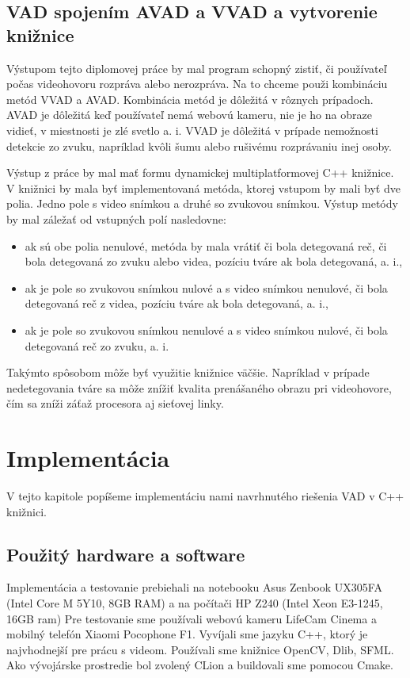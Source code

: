 \section{VAD spojením AVAD a VVAD a vytvorenie knižnice}
Výstupom tejto diplomovej práce by mal program schopný zistiť, či používateľ počas videohovoru rozpráva alebo nerozpráva. 
Na to chceme použi kombináciu metód VVAD a AVAD. 
Kombinácia metód je dôležitá v rôznych prípadoch. 
AVAD je dôležitá keď používateľ nemá webovú kameru, nie je ho na obraze vidieť, v miestnosti je zlé svetlo a. i.
VVAD je dôležitá v prípade nemožnosti detekcie zo zvuku, napríklad kvôli šumu alebo rušivému rozprávaniu inej osoby.

Výstup z práce by mal mať formu dynamickej multiplatformovej C++ knižnice. 
V knižnici by mala byť implementovaná metóda, ktorej vstupom by mali byť dve polia. 
Jedno pole s video snímkou a druhé so zvukovou snímkou.
Výstup metódy by mal záležať od vstupných polí nasledovne:
\begin{itemize}
	\item ak sú obe polia nenulové, metóda by mala vrátiť či bola detegovaná reč, či bola detegovaná zo zvuku alebo videa, pozíciu tváre ak bola detegovaná, a. i., 
	\item ak je pole so zvukovou snímkou nulové a s video snímkou nenulové, či bola detegovaná reč z videa, pozíciu tváre ak bola detegovaná, a. i.,
	\item ak je pole so zvukovou snímkou nenulové a s video snímkou nulové, či bola detegovaná reč zo zvuku, a. i.
\end{itemize}
Takýmto spôsobom môže byť využitie knižnice väčšie.
Napríklad v prípade nedetegovania tváre sa môže znížiť kvalita prenášaného obrazu pri videohovore, čím sa zníži záťaž procesora aj sieťovej linky.

\chapter{Implementácia}
V tejto kapitole popíšeme implementáciu nami navrhnutého riešenia VAD v C++ knižnici.

\section{Použitý hardware a software}
Implementácia a testovanie prebiehali na notebooku Asus Zenbook UX305FA (Intel Core M 5Y10, 8GB RAM) a na počítači HP Z240 (Intel Xeon E3-1245, 16GB ram)
Pre testovanie sme používali webovú kameru LifeCam Cinema a mobilný telefón Xiaomi Pocophone F1.
Vyvíjali sme jazyku C++, ktorý je najvhodnejší pre prácu s videom.
Používali sme knižnice OpenCV, Dlib, SFML.
Ako vývojárske prostredie bol zvolený CLion a buildovali sme pomocou Cmake.

